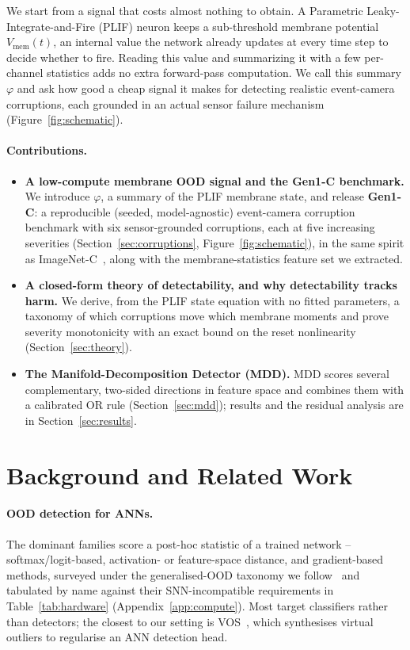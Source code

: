 ﻿\documentclass{article} %
\theoremstyle{remark}
\begin{document}
We start from a signal that costs almost nothing to obtain. A
Parametric Leaky-Integrate-and-Fire (PLIF) neuron keeps a sub-threshold membrane
potential $V_{\mathrm{mem}}(t)$, an internal value the network already updates at every
time step to decide whether to fire. Reading this value and summarizing it with a few per-channel
statistics adds no extra forward-pass computation. We call this summary $\varphi$ and ask how good a
cheap signal it makes for detecting realistic event-camera corruptions, each grounded in an actual
sensor failure mechanism (Figure~\ref{fig:schematic}).

\paragraph{Contributions.}
\begin{itemize}[leftmargin=*,itemsep=2pt,topsep=2pt]
    \item \textbf{A low-compute membrane OOD signal and the Gen1-C benchmark.} We introduce
    $\varphi$, a summary of the PLIF membrane state, and release \textbf{Gen1-C}: a reproducible
    (seeded, model-agnostic) event-camera corruption benchmark with six sensor-grounded
    corruptions, each at five increasing severities (Section~\ref{sec:corruptions},
    Figure~\ref{fig:schematic}), in the same spirit as ImageNet-C~\citep{hendrycks2019imagenetc},
    along with the membrane-statistics feature set we extracted.
    \item \textbf{A closed-form theory of detectability, and why detectability tracks harm.} We
    derive, from the PLIF state equation with no fitted parameters, a taxonomy of which
    corruptions move which membrane moments and prove severity monotonicity with an exact bound
    on the reset nonlinearity (Section~\ref{sec:theory}).
    \item \textbf{The Manifold-Decomposition Detector (MDD).} MDD scores several complementary,
    two-sided directions in feature space and combines them with a calibrated OR rule
    (Section~\ref{sec:mdd}); results and the residual analysis are in
    Section~\ref{sec:results}.
\end{itemize}

\section{Background and Related Work}
\label{sec:related}

\paragraph{OOD detection for ANNs.}
The dominant families score a post-hoc statistic of a trained network -- softmax/logit-based,
activation- or feature-space distance, and gradient-based methods, surveyed under the
generalised-OOD taxonomy we follow~\citep{yang2024oodsurvey} and tabulated by name against their
SNN-incompatible requirements in Table~\ref{tab:hardware} (Appendix~\ref{app:compute}). Most target
classifiers rather than detectors; the closest to our setting is VOS~\citep{du2022vos}, which
synthesises virtual outliers to regularise an ANN detection head.
\end{document}
